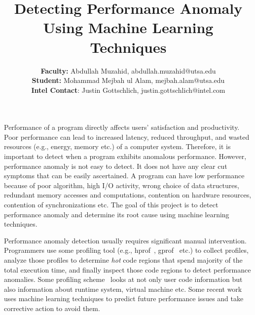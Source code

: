 \documentclass[times, 11pt, letterpaper]{article}
\title{Detecting Performance Anomaly Using Machine Learning Techniques}
\author{\hspace{-0.9cm}\textbf{Faculty:} Abdullah Muzahid, abdullah.muzahid@utsa.edu\\
            \textbf{Student:} Mohammad Mejbah ul Alam, mejbah.alam@utsa.edu\\
            \textbf{Intel Contact}: Justin Gottschlich, justin.gottschlich@intel.com }
\date{}
\begin{document}
\maketitle
\vspace{-0.5cm}


Performance of a program directly affects users' satisfaction and productivity.
Poor performance can lead to increased latency, reduced throughput,
and wasted resources (e.g., energy, memory etc.) of a computer system. Therefore,
it is important to detect when a program exhibits anomalous performance. However,
performance anomaly is not easy to detect. It
does not have any clear cut symptoms that can be easily ascertained. A program can 
have low performance because of poor algorithm, high I/O activity, wrong choice 
of data structures, redundant memory accesses and computations, 
contention on hardware resources, contention of synchronizations etc.
The goal of this project is to detect performance anomaly and determine its root cause using
machine learning techniques.

Performance anomaly detection usually requires significant manual intervention.
Programmers use some profiling tool (e.g., hprof~\cite{hprof}, gprof~\cite{gprof} etc.) 
to collect profiles, analyze those profiles to
determine {\em hot} code regions that spend majority of the total execution time, and finally inspect those code
regions to detect performance anomalies. Some profiling scheme~\cite{verticalprofiling} looks at
not only user code information but also information about runtime system, virtual machine etc.
Some recent work~\cite{prepare} uses machine learning techniques to predict future
performance issues and take corrective action to avoid them.
\end{document}
